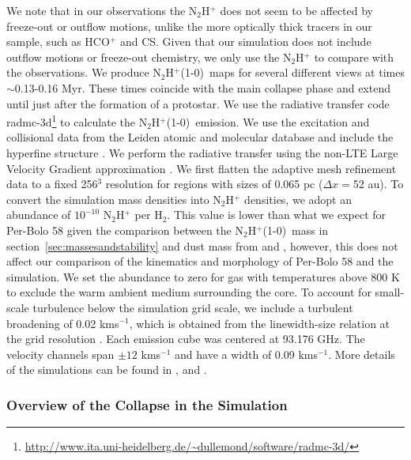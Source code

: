 \documentclass[iop]{emulateapj}
\newcommand{\nthp}{\mbox{\rm N$_2$H$^+$(1-0)}}
\begin{document}
We note that in our observations the N$_2$H$^+$ does not seem to be affected by freeze-out or outflow motions, unlike the more optically thick tracers in our sample, such as HCO$^+$ and CS. Given that our simulation does not include outflow motions or freeze-out chemistry, we only use the N$_2$H$^+$ to compare with the observations. We produce \nthp\ maps for several different views at times $\sim$0.13-0.16 Myr. These times coincide with the main collapse phase and extend until just after the formation of a protostar.  We use the radiative transfer code {\sc radmc-3d}\footnote{\url{http://www.ita.uni-heidelberg.de/~dullemond/software/radmc-3d/}} to calculate the \nthp\ emission. We use the excitation and collisional data from the Leiden atomic and molecular database and include the hyperfine structure \citep{schoier05}. We perform the radiative transfer using the non-LTE Large Velocity Gradient approximation \citep{shetty11}.  We first flatten the adaptive mesh refinement data to a fixed 256$^3$ resolution for regions with sizes of 0.065 pc ($\Delta x=$52 au). To convert the simulation mass densities into N$_2$H$^+$ densities, we adopt an abundance of $10^{-10}$ N$_2$H$^+$ per H$_2$. This value is lower than what we expect for Per-Bolo 58 given the comparison between the \nthp\ mass in section~\ref{sec:massesandstability} and dust mass from \cite{2010EnochCandidate} and \cite{2010SchneeObserved}, however, this does not affect our comparison of the kinematics and morphology of Per-Bolo 58 and the simulation. We set the abundance to zero for gas with temperatures above 800 K to exclude the warm ambient medium surrounding the core. To account for small-scale turbulence below the simulation grid scale, we include a turbulent broadening of 0.02 kms$^{-1}$, which is obtained from the linewidth-size relation at the grid resolution \citep{2007McKeeTheory}. Each emission cube was centered at 93.176 GHz. The velocity channels span $\pm 12$ kms$^{-1}$ and have a width of 0.09 kms$^{-1}$. More details of the simulations can be found in \cite{2016DunhamALMA}, \cite{2016OffnerTurbulent} and \cite{2017OffnerImpact}.

\subsubsection{Overview of the Collapse in the Simulation}
\end{document}
